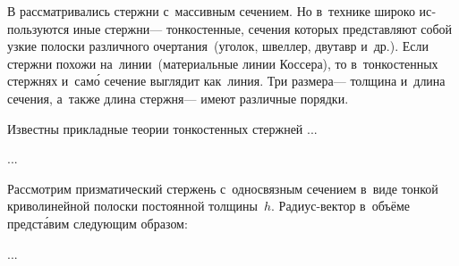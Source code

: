 

\thispagestyle{empty}

\label{chapter:thinwalledrods}



\begin{otherlanguage}{russian}

\lettrine[lines=2, findent=2pt, nindent=0pt]{В}{\hspace{-0.25ex}}  рассматривались стержни с~массивным сечением. Но в~технике широко используются иные стержни\:--- тонкостенные, сечения которых представляют собой узкие полоски различного очертания~(уголок, швеллер, двутавр и~др.). Если стержни похожи на~линии~(материальные линии Коссера), то в~тонкостенных стержнях и~сам\'{о} сечение выглядит как~линия. Три размера\:--- толщина и~длина сечения, а~также длина стержня\:--- имеют различные порядки.

Известны прикладные теории тонкостенных стержней ...

...



\end{otherlanguage}



\begin{otherlanguage}{russian}

Рассмотрим призматический стержень с~односвязным сечением в~виде тонкой криволинейной полоски постоянной толщины~$h$. Радиус\hbox{-}вектор в~объёме предст\'{а}вим следующим образом:

...



\end{otherlanguage}

